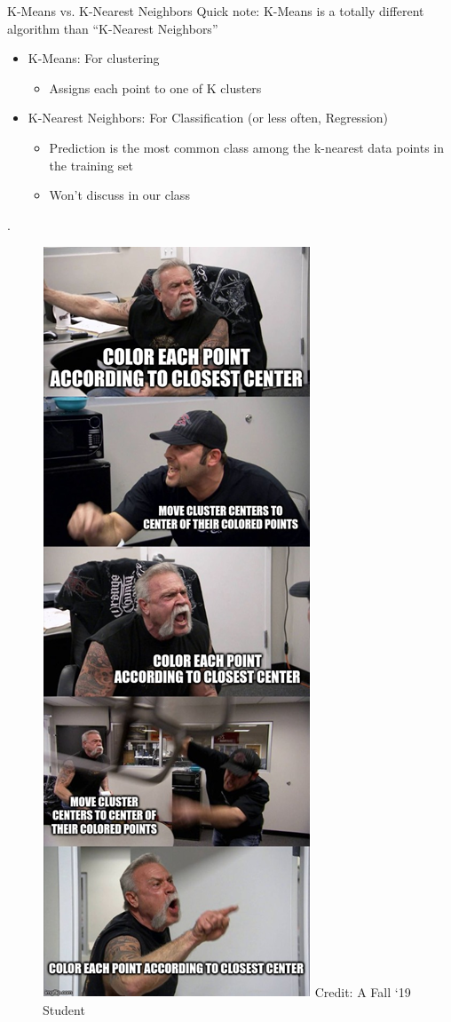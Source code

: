 \documentclass[aspectratio=169]{../latex_main/tntbeamer}  %
\begin{document}
	\begin{frame}[c]{K-Means vs. K-Nearest Neighbors}
	    Quick note: K-Means is a totally different algorithm than “K-Nearest Neighbors”
	    \begin{itemize}
	        \item K-Means: For clustering
	        \begin{itemize}
	            \item Assigns each point to one of K clusters
	        \end{itemize}
	        \item K-Nearest Neighbors: For Classification (or less often, Regression)
	        \begin{itemize}
	            \item Prediction is the most common class among the k-nearest data points in the training set
	            \item Won’t discuss in our class
	        \end{itemize}
	    \end{itemize}
	\end{frame}
	
	
	\begin{frame}{.}
	    \begin{figure}
	        
	        
	        \centering
	        \includegraphics[scale=.45]{Bild20}
	       Credit: A Fall ‘19 Student
	    \end{figure}
	    
	\end{frame}
\end{document}
